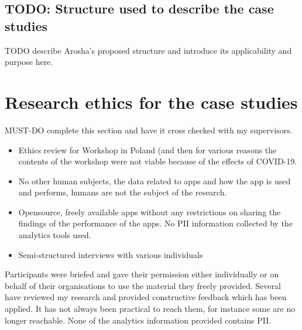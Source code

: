 \subsection{TODO: Structure used to describe the case studies}
TODO describe Arosha's proposed structure and introduce its applicability and purpose here.


\section{Research ethics for the case studies}
\label{section-research-ethics-for-the-case-studies}

MUST-DO complete this section and have it cross checked with my supervisors.

\begin{itemize}
    \item Ethics review for Workshop in Poland (and then for various reasons the contents of the workshop were not viable because of the effects of COVID-19.
    \item No other human subjects, the data related to apps and how the app is used and performs, humans are not the subject of the research.
    \item Opensource, freely available apps without any restrictions on sharing the findings of the performance of the apps. No PII information collected by the analytics tools used.
    \item Semi-structured interviews with various individuals 
\end{itemize}

Participants were briefed and gave their permission either individually or on behalf of their organisations to use the material they freely provided. Several have reviewed my research and provided constructive feedback which has been applied. It has not always been practical to reach them, for instance some are no longer reachable. None of the analytics information provided contains PII. 
\clearpage


\clearpage


\clearpage


\clearpage


\clearpage


\clearpage


\clearpage


\clearpage


\clearpage


\clearpage